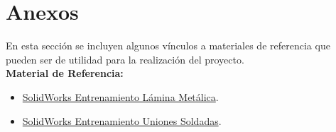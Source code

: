 \documentclass[10pt]{article}
\begin{document}
\section{Anexos}
En esta sección se incluyen algunos vínculos a materiales de referencia que pueden ser de utilidad para la realización del proyecto.\\
\textbf{Material de Referencia:}\\
\begin{itemize}
    \item \href{https://my.solidworks.com/training/elearning/64/sheet-metal}{SolidWorks Entrenamiento Lámina Metálica}.
    \item \href{https://my.solidworks.com/training/elearning/63/weldments}{SolidWorks Entrenamiento Uniones Soldadas}.
\end{itemize}
\end{document}
